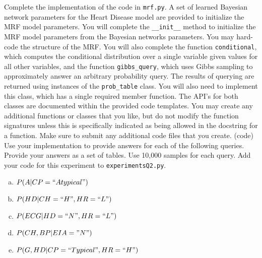 \documentclass[11pt]{article}
\begin{document}
\begin{problem}{50}
 Complete the implementation of the code in \verb|mrf.py|.
A set of learned Bayesian network parameters for the Heart Disease model
are provided to initialize the MRF model parameters. You will complete
the \verb|__init__| method to initialize the MRF model parameters from the 
Bayesian networks parameters. You may hard-code the structure of the MRF.
You will also complete the function 
\verb|conditional|, which computes the conditional distribution over a single
variable given values for all other variables, and the function 
\verb|gibbs_query|, which uses Gibbs sampling to approximately answer an
arbitrary probability query. The results of querying are returned 
using instances of the \verb|prob_table| class. You will also need to
implement this class, which has a single required member function. 
The API's for both classes are documented within the provided code templates.
You  may create any additional functions or classes that you like, but do not
modify the function signatures unless this is specifically indicated as
being allowed in the docstring for a function. Make sure to 
submit  any additional code files that you create. (code)\\

 Use your implementation to provide answers for each of the following 
queries. Provide your answers as a set of tables. Use 10,000 samples for each query. 
Add your code for this experiment to \verb|experimentsQ2.py|.\\

\begin{enumerate}[(a)]
	\item $P(A|CP=``Atypical")$
	\item $P(HD|CH=``H",HR=``L")$
	\item $P(ECG|HD=``N", HR=``L")$
	\item $P(CH,BP|EIA="N")$
	\item $P(G, HD|CP=``Typical",HR=``H")$	
\end{enumerate}	


\end{problem}


\showpoints
\end{document}
